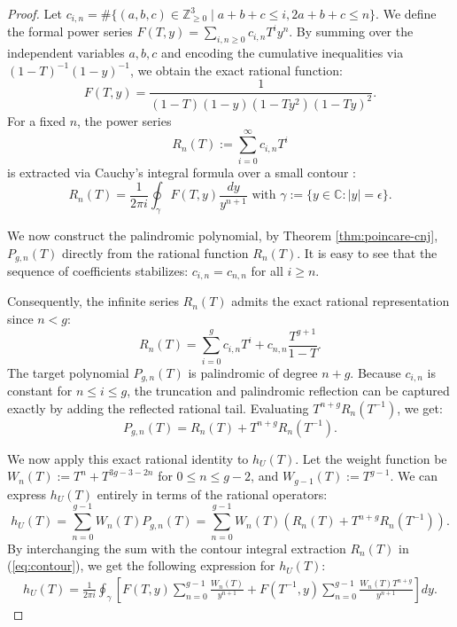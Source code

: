 \documentclass[11pt]{amsart}
\theoremstyle{definition}
\begin{document}
\begin{proof}

Let $c_{i,n} = \#\{(a,b,c) \in \mathbb{Z}_{\geq 0}^3 \mid a+b+c \leq i, 2a+b+c \leq n\}$. 
We define the formal power series $F(T,y) = \sum_{i,n \geq 0} c_{i,n} T^i y^n$. By summing over the independent variables $a,b,c$ and encoding the cumulative inequalities via $(1-T)^{-1}(1-y)^{-1}$, we obtain the exact rational function:
\begin{equation*}
F(T,y) = \frac{1}{(1-T)(1-y)(1-Ty^2)(1-Ty)^2}.
\end{equation*}
For a fixed $n$, the power series 
$$R_n(T) := \sum_{i=0}^\infty c_{i,n} T^i$$
 is extracted via Cauchy's integral formula over a small contour :
\begin{equation}\label{eq:contour}
R_n(T) = \frac{1}{2\pi i} \oint_{\gamma} F(T,y) \frac{dy}{y^{n+1}} \text{ with } \gamma := \{y \in \mathbb{C} : |y| = \epsilon\}.
\end{equation}

We now construct the palindromic polynomial, by Theorem \ref{thm:poincare-cnj}, $P_{g,n}(T)$ directly from the rational function $R_n(T)$. 
It is easy to see that the sequence of coefficients stabilizes: $c_{i,n} = c_{n,n}$ for all $i \geq n$.

Consequently, the infinite series $R_n(T)$ admits the exact rational representation since $n<g$:
\begin{equation*}
R_n(T) = \sum_{i=0}^{g} c_{i,n} T^i + c_{n,n} \frac{T^{g+1}}{1-T}.
\end{equation*}
The target polynomial $P_{g,n}(T)$ is palindromic of degree $n+g$. 
Because $c_{i,n}$ is constant for $n \leq i \leq g$, the truncation and palindromic reflection can be captured exactly by adding the reflected rational tail. 
Evaluating $T^{n+g} R_n(T^{-1})$, we get:
\begin{equation*}
P_{g,n}(T) = R_n(T) + T^{n+g} R_n(T^{-1}).
\end{equation*}

We now apply this exact rational identity to $h_U(T)$. 
Let the weight function be $W_n(T) := T^n + T^{3g-3-2n}$ for $0\leq n \leq g-2$, and $W_{g-1}(T) := T^{g-1}$. 
We can express $h_U(T)$ entirely in terms of the rational operators:
\begin{equation*}
h_U(T) = \sum_{n=0}^{g-1} W_n(T) P_{g,n}(T) = \sum_{n=0}^{g-1} W_n(T) \left( R_n(T) + T^{n+g} R_n(T^{-1}) \right).
\end{equation*}
By interchanging the sum with the contour integral extraction $R_n(T)$ in (\ref{eq:contour}), we get the following expression for $h_U(T)$:
\begin{align*}
h_U(T) = \frac{1}{2\pi i} \oint_{\gamma} \left[ F(T,y) \sum_{n=0}^{g-1} \frac{W_n(T)}{y^{n+1}} + F(T^{-1}, y) \sum_{n=0}^{g-1} \frac{W_n(T) T^{n+g}}{y^{n+1}} \right] dy.
\end{align*}


\end{proof}
\end{document}
